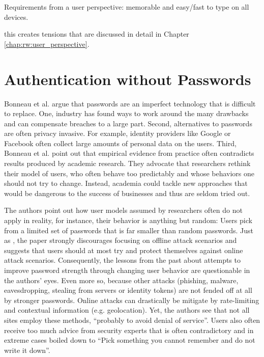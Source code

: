 Requirements from a user perspective: memorable and easy/fast to type on all devices.

this creates tensions that are discussed in detail in Chapter \ref{chap:rw:user_perspective}.


\section{Authentication without Passwords}
Bonneau et al. argue \cite{Bonneau2015ImperfectAuthentication} that passwords are an imperfect technology that is difficult to replace. One, industry has found ways to work around the many drawbacks and can compensate breaches to a large part. Second, alternatives to passwords are often privacy invasive. For example, identity providers like Google or Facebook often collect large amounts of personal data on the users. Third, Bonneau et al. point out that empirical evidence from practice often contradicts results produced by academic research. They advocate that researchers rethink their model of users, who often behave too predictably and whose behaviors one should not try to change. Instead, academia could tackle new approaches that would be dangerous to the success of businesses and thus are seldom tried out. 

The authors point out how user models assumed by researchers often do not apply in reality, for instance, their behavior is anything but random: Users pick from a limited set of passwords that is far smaller than random passwords. Just as \cite{Florencio2014PasswordPortfoliosFiniteUser}, the paper strongly discourages focusing on offline attack scenarios and suggests that users should at most try and protect themselves against online attack scenarios. Consequently, the lessons from the past about attempts to improve password strength through changing user behavior are questionable in the authors' eyes. Even more so, because other attacks (phishing, malware, eavesdropping, stealing from servers or identity tokens) are not fended off at all by stronger passwords. Online attacks can drastically be mitigate by rate-limiting and contextual information (e.g. geolocation). Yet, the authors see that not all sites employ these methods, ``probably to avoid denial of service''. Users also often receive too much advice from security experts that is often contradictory and in extreme cases boiled down to ``Pick something you cannot remember and do not write it down''. 

